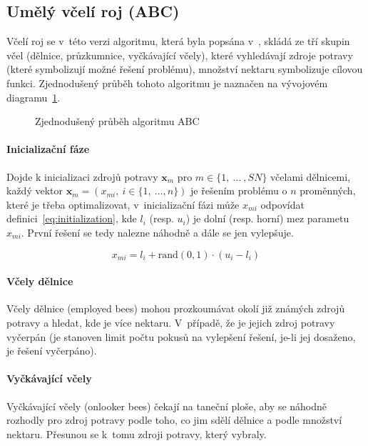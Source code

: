 \documentclass[twoside]{ctuthesis}
\begin{document}
\begin{enumerate}[label=\textbf{O\arabic*.}]
\subsection{Umělý včelí roj (ABC)}
Včelí roj se v~této verzi algoritmu, která byla popsána v~\cite{karaboga2010artificial}, skládá ze tří skupin včel (dělnice, průzkumnice, vyčkávající včely), které vyhledávají zdroje potravy (které symbolizují možné řešení problému), množství nektaru symbolizuje cílovou funkci. \cite{anuar2016modified} Zjednodušený průběh tohoto algoritmu je naznačen na vývojovém diagramu~\ref{fig:abcflow}.

\begin{figure}[h]
	
	\caption{Zjednodušený průběh algoritmu ABC}
	\label{fig:abcflow}
\end{figure}

\paragraph{Inicializační fáze}
Dojde k inicializaci zdrojů potravy $\boldsymbol{x}_m$ pro $m \in \{1,~\ldots~, SN\}$ včelami dělnicemi, každý vektor $\boldsymbol{x}_m = (x_{mi},~i \in \{1,~\ldots, n \})$ je řešením problému o $n$ proměnných, které je třeba optimalizovat, v~inicializační fázi může $x_{mi}$ odpovídat definici~\ref{eq:initialization}, kde $l_i$ (resp. $u_i$) je dolní (resp. horní) mez parametu $x_{mi}$. První řešení se tedy nalezne náhodně a dále se jen vylepšuje.
\cite{karaboga2010artificial}

\begin{equation}
	\label{eq:initialization}
	x_{mi} = l_i + \mbox{rand}(0,1) \cdot (u_i - l_i)
\end{equation}

\paragraph{Včely dělnice}
Včely dělnice (employed bees) mohou prozkoumávat okolí již známých zdrojů potravy a hledat, kde je více nektaru. V~případě, že je jejich zdroj potravy vyčerpán (je stanoven limit počtu pokusů na vylepšení řešení, je-li jej dosaženo, je řešení vyčerpáno).

\paragraph{Vyčkávající včely}
Vyčkávající včely (onlooker bees) čekají na taneční ploše, aby se náhodně rozhodly pro zdroj potravy podle toho, co jim sdělí dělnice a podle množství nektaru. Přesunou se k~tomu zdroji potravy, který vybraly.


\end{enumerate}
\end{document}
